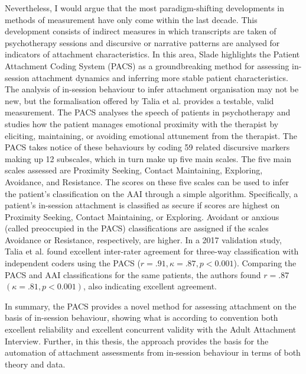\documentclass[12pt]{report}
\begin{document}
Nevertheless, I would argue that the most paradigm-shifting developments in methods of measurement have only come within the last decade.
This development consists of indirect measures in which transcripts are taken of psychotherapy sessions and discursive or narrative patterns are analysed for indicators of attachment characteristics.
In this area, Slade \citeyear{Slade2016} highlights the Patient Attachment Coding System (PACS) as a groundbreaking method for assessing in-session attachment dynamics and inferring more stable patient characteristics.
The analysis of in-session behaviour to infer attachment organisation may not be new, but the formalisation offered by Talia et al. \citeyear{Talia2017, Talia2014} provides a testable, valid measurement.
The PACS analyses the speech of patients in psychotherapy and studies how the patient manages emotional proximity with the therapist by eliciting, maintaining, or avoiding emotional attunement from the therapist.
The PACS takes notice of these behaviours by coding 59 related discursive markers making up 12 subscales, which in turn make up five main scales.
The five main scales assessed are Proximity Seeking, Contact Maintaining, Exploring, Avoidance, and Resistance.
The scores on these five scales can be used to infer the patient's classification on the AAI through a simple algorithm.
Specifically, a patient's in-session attachment is classified as secure if scores are highest on Proximity Seeking, Contact Maintaining, or Exploring.
Avoidant or anxious (called preoccupied in the PACS) classifications are assigned if the scales Avoidance or Resistance, respectively, are higher.
In a 2017 validation study, Talia et al. \citeyear{Talia2017} found excellent inter-rater agreement for three-way classification with independent coders using the PACS ($r=.91, \kappa = .87, p<0.001$).
Comparing the PACS and AAI classifications for the same patients, the authors found $r=.87$ $(\kappa = .81, p<0.001)$, also indicating excellent agreement.

In summary, the PACS provides a novel method for assessing attachment on the basis of in-session behaviour, showing what is according to convention \cite{Cicchetti1994} both excellent reliability and excellent concurrent validity with the Adult Attachment Interview.
Further, in this thesis, the approach provides the basis for the automation of attachment assessments from in-session behaviour in terms of both theory and data.
\end{document}
